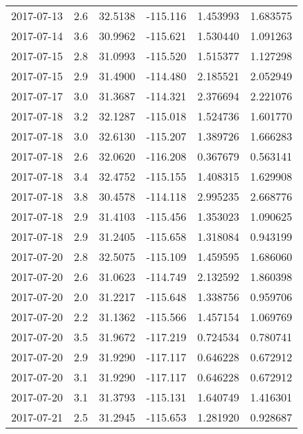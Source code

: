 \begin{tabular}{lrrrrr}
2017-07-13 &       2.6 &  32.5138 &  -115.116 &         1.453993 &         1.683575 \\
2017-07-14 &       3.6 &  30.9962 &  -115.621 &         1.530440 &         1.091263 \\
2017-07-15 &       2.8 &  31.0993 &  -115.520 &         1.515377 &         1.127298 \\
2017-07-15 &       2.9 &  31.4900 &  -114.480 &         2.185521 &         2.052949 \\
2017-07-17 &       3.0 &  31.3687 &  -114.321 &         2.376694 &         2.221076 \\
2017-07-18 &       3.2 &  32.1287 &  -115.018 &         1.524736 &         1.601770 \\
2017-07-18 &       3.0 &  32.6130 &  -115.207 &         1.389726 &         1.666283 \\
2017-07-18 &       2.6 &  32.0620 &  -116.208 &         0.367679 &         0.563141 \\
2017-07-18 &       3.4 &  32.4752 &  -115.155 &         1.408315 &         1.629908 \\
2017-07-18 &       3.8 &  30.4578 &  -114.118 &         2.995235 &         2.668776 \\
2017-07-18 &       2.9 &  31.4103 &  -115.456 &         1.353023 &         1.090625 \\
2017-07-18 &       2.9 &  31.2405 &  -115.658 &         1.318084 &         0.943199 \\
2017-07-20 &       2.8 &  32.5075 &  -115.109 &         1.459595 &         1.686060 \\
2017-07-20 &       2.6 &  31.0623 &  -114.749 &         2.132592 &         1.860398 \\
2017-07-20 &       2.0 &  31.2217 &  -115.648 &         1.338756 &         0.959706 \\
2017-07-20 &       2.2 &  31.1362 &  -115.566 &         1.457154 &         1.069769 \\
2017-07-20 &       3.5 &  31.9672 &  -117.219 &         0.724534 &         0.780741 \\
2017-07-20 &       2.9 &  31.9290 &  -117.117 &         0.646228 &         0.672912 \\
2017-07-20 &       3.1 &  31.9290 &  -117.117 &         0.646228 &         0.672912 \\
2017-07-20 &       3.1 &  31.3793 &  -115.131 &         1.640749 &         1.416301 \\
2017-07-21 &       2.5 &  31.2945 &  -115.653 &         1.281920 &         0.928687 \\

\end{tabular}
